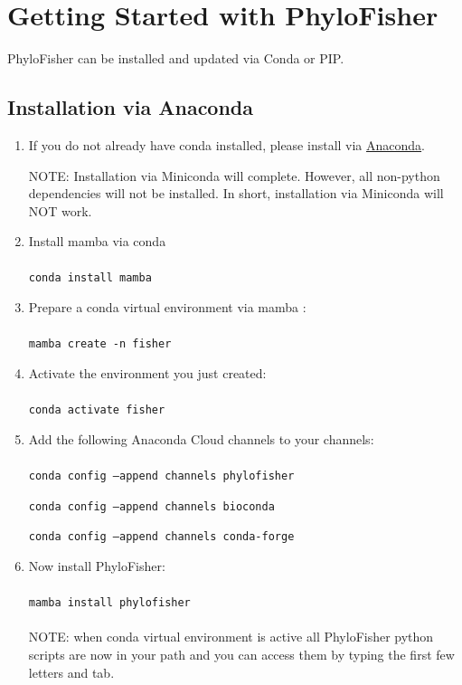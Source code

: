 \documentclass{article}
\def\code#1{\texttt{#1}}
\begin{document}
    \section{Getting Started with PhyloFisher}

        PhyloFisher can be installed and updated via Conda or PIP.
        \subsection{Installation via Anaconda}
        \begin{enumerate}[itemsep=12pt]
            \item If you do not already have conda installed, please install via \href{https://docs.conda.io/projects/conda/en/latest/user-guide/install/}{Anaconda}.
                
            NOTE: Installation via Miniconda will complete. However, all non-python dependencies will not be installed. In short, installation via Miniconda will NOT work.
            
            \item Install mamba via conda
            \\\\
            \code{conda install mamba}
            \item Prepare a conda virtual environment via mamba \label{step:env}:
            \\\\
            \code{mamba create -n fisher}
            \item Activate the environment you just created:
            \\\\
            \code{conda activate fisher}
            \item Add the following Anaconda Cloud channels to your channels:
            \\\\
            \code{conda config --append channels phylofisher}
            
	        \code{conda config --append channels bioconda}
	        
	        \code{conda config --append channels conda-forge}
            \item Now install PhyloFisher:
            \\\\
            \code{mamba install phylofisher}
            \\\\
            NOTE: when conda virtual environment is active all PhyloFisher python scripts are now in your path and you can access them by typing the first few letters and tab.
        \end{enumerate}
        
\end{document}

